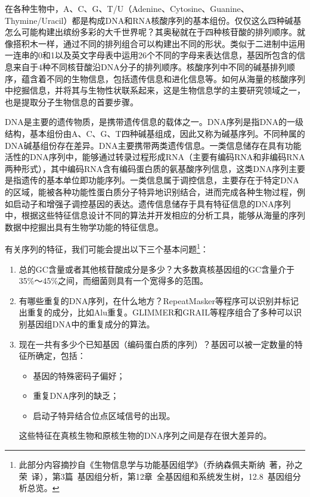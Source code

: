 \documentclass[11pt,a4paper,twoside]{book}
\begin{document}
在各种生物中，A、C、G、T/U（Adenine、Cytosine、Guanine、Thymine/Uracil）都是构成DNA和RNA核酸序列的基本组份。仅仅这么四种碱基怎么可能构建出缤纷多彩的大千世界呢？其奥秘就在于四种核苷酸的排列顺序。就像搭积木一样，通过不同的排列组合可以构建出不同的形状。类似于二进制中运用一连串的0和1以及英文字母表中运用26个不同的字母来表达信息，基因所包含的信息来自于4种不同核苷酸沿DNA分子的排列顺序。核酸序列中不同的碱基排列顺序，蕴含着不同的生物信息，包括遗传信息和进化信息等。如何从海量的核酸序列中挖掘信息，并将其与生物性状联系起来，这是生物信息学的主要研究领域之一，也是提取分子生物信息的首要步骤。

DNA是主要的遗传物质，是携带遗传信息的载体之一。DNA序列是指DNA的一级结构，基本组份由A、C、G、T四种碱基组成，因此又称为碱基序列。不同种属的DNA碱基组份存在差异。DNA主要携带两类遗传信息。一类信息储存在具有功能活性的DNA序列中，能够通过转录过程形成RNA（主要有编码RNA和非编码RNA两种形式），其中编码RNA含有编码蛋白质的氨基酸序列信息，这类DNA序列主要是指遗传的基本单位即功能序列。一类信息属于调控信息，主要存在于特定DNA的区域，能被各种功能性蛋白质分子特异地识别结合，进而完成各种生物过程，例如启动子和增强子调控基因的表达。遗传信息储存于具有特征信息的DNA序列中，根据这些特征信息设计不同的算法并开发相应的分析工具，能够从海量的序列数据中挖掘出具有生物学功能的特征信息。

有关序列的特征，我们可能会提出以下三个基本问题\footnote{此部分内容摘抄自《生物信息学与功能基因组学》（乔纳森\textbullet 佩夫斯纳\ 著，孙之荣\ 译），第3篇\ 基因组分析，第12章\ 全基因组和系统发生树，12.8\ 基因组分析总览。}：
\begin{enumerate}
  \item 总的GC含量或者其他核苷酸成分是多少？大多数真核基因组的GC含量介于35\%～45\%之间，而细菌则具有一个宽得多的范围。
  \item 有哪些重复的DNA序列，在什么地方？RepeatMasker等程序可以识别并标记出重复的成分，比如Alu重复。GLIMMER和GRAIL等程序组合了多种可以识别基因组DNA中的重复成分的算法。
  \item 现在一共有多少个已知基因（编码蛋白质的序列）？基因可以被一定数量的特征所确定，包括：
    \begin{itemize}
      \item 基因的特殊密码子偏好；
      \item 重复DNA序列的缺乏；
      \item 启动子特异结合位点区域信号的出现。
    \end{itemize}
    这些特征在真核生物和原核生物的DNA序列之间是存在很大差异的。
\end{enumerate}
\end{document}
